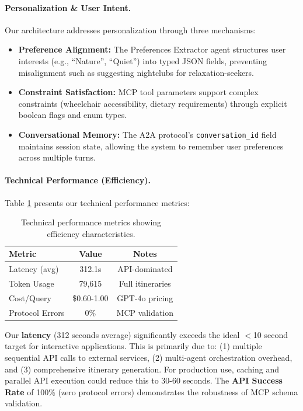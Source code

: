 \documentclass[conference]{IEEEtran}
\begin{document}
\paragraph{Personalization \& User Intent.}
Our architecture addresses personalization through three mechanisms:
\begin{itemize}
    \item \textbf{Preference Alignment:} The Preferences Extractor agent structures user interests (e.g., ``Nature'', ``Quiet'') into typed JSON fields, preventing misalignment such as suggesting nightclubs for relaxation-seekers.
    \item \textbf{Constraint Satisfaction:} MCP tool parameters support complex constraints (wheelchair accessibility, dietary requirements) through explicit boolean flags and enum types.
    \item \textbf{Conversational Memory:} The A2A protocol's \texttt{conversation\_id} field maintains session state, allowing the system to remember user preferences across multiple turns.
\end{itemize}

\paragraph{Technical Performance (Efficiency).}
Table \ref{tab:technical_perf} presents our technical performance metrics:

\begin{table}[h]
\centering
\small
\begin{tabular}{lcc}
\toprule
\textbf{Metric} & \textbf{Value} & \textbf{Notes} \\
\midrule
Latency (avg) & 312.1s & API-dominated \\
Token Usage & 79,615 & Full itineraries \\
Cost/Query & \$0.60-1.00 & GPT-4o pricing \\
Protocol Errors & 0\% & MCP validation \\
\bottomrule
\end{tabular}
\caption{Technical performance metrics showing efficiency characteristics.}
\label{tab:technical_perf}
\end{table}

Our \textbf{latency} (312 seconds average) significantly exceeds the ideal $<$10 second target for interactive applications. This is primarily due to: (1) multiple sequential API calls to external services, (2) multi-agent orchestration overhead, and (3) comprehensive itinerary generation. For production use, caching and parallel API execution could reduce this to 30-60 seconds. The \textbf{API Success Rate} of 100\% (zero protocol errors) demonstrates the robustness of MCP schema validation.
\end{document}
